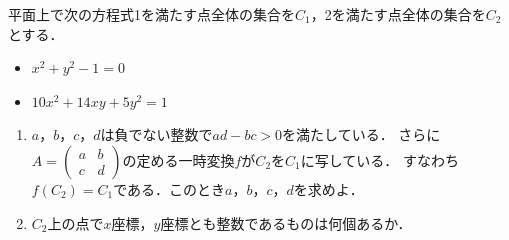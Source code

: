 \documentclass[../../main.tex]{subfiles}
\begin{document}
平面上で次の方程式1を満たす点全体の集合を$C_1$，2を満たす点全体の集合を$C_2$とする．
\begin{itemize}
  \item[1] $x^2+y^2-1=0$
  \item[2] $10x^2+14xy+5y^2=1$
\end{itemize}
\begin{enumerate}
  \item $a$，$b$，$c$，$d$は負でない整数で$ad-bc>0$を満たしている．
    さらに$A=
    \begin{pmatrix} a&b\\ c&d
    \end{pmatrix}$の定める一時変換$f$が$C_2$を$C_1$に写している．
    すなわち$f(C_2)=C_1$である．このとき$a$，$b$，$c$，$d$を求めよ．
  \item $C_2$上の点で$x$座標，$y$座標とも整数であるものは何個あるか．
\end{enumerate}
\end{document}
